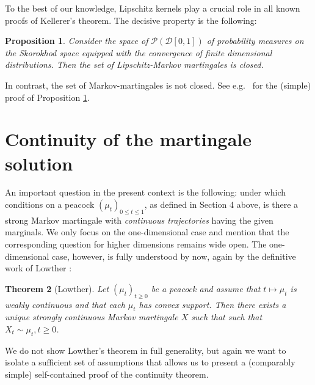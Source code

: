 \documentclass[11pt,a4paper]{article}%
\def\comment#1{\marginpar{\raggedright\scriptsize{\textcolor{purple}{#1}}}}
\newtheorem{theorem}{Theorem}[section]
\newtheorem{proposition}[theorem]{Proposition}
\numberwithin{equation}{section}
\begin{document}
To the best of our knowledge, Lipschitz kernels play a crucial role in all known proofs of Kellerer's theorem. The decisive property is the following: 
\begin{proposition}\label{LMclosed}
Consider the space of $\mathcal P(\mathcal D[0,1])$ of probability measures on the Skorokhod space equipped with the convergence of finite dimensional distributions.  Then the set of Lipschitz-Markov martingales is closed. 
\end{proposition}
In contrast, the set of Markov-martingales is not closed. 
See e.g.\ \cite{BeHuSt16} for the (simple) proof of Proposition \ref{LMclosed}.


\section{Continuity of the martingale solution}

An important question in the present context is the following: under which conditions on a peacock $(\mu_t)_{0\le t \le 1}$, as defined in Section 4 above, is there a 
strong Markov martingale with \textit{continuous trajectories} having the given marginals. We only focus on the one-dimensional case and mention that the corresponding question for higher dimensions remains wide open. The one-dimensional case, however, is fully understood by now, again by the definitive work of Lowther \cite[Theorem 1.3]{Lo08b}:
\begin{theorem}[Lowther]%
Let $(\mu_t)_{t\geq 0}$ be a peacock and assume that $t\mapsto \mu_t$ is weakly continuous and that each $\mu_t$ has convex support. Then there exists a unique strongly continuous Markov martingale $X$ such that such that $X_t\sim \mu_t, t\geq 0$. 
\end{theorem}






We do not show Lowther's theorem in full generality, but again we want to isolate a sufficient set of assumptions that allows us to present a (comparably simple) self-contained proof of the continuity theorem. 
\end{document}
